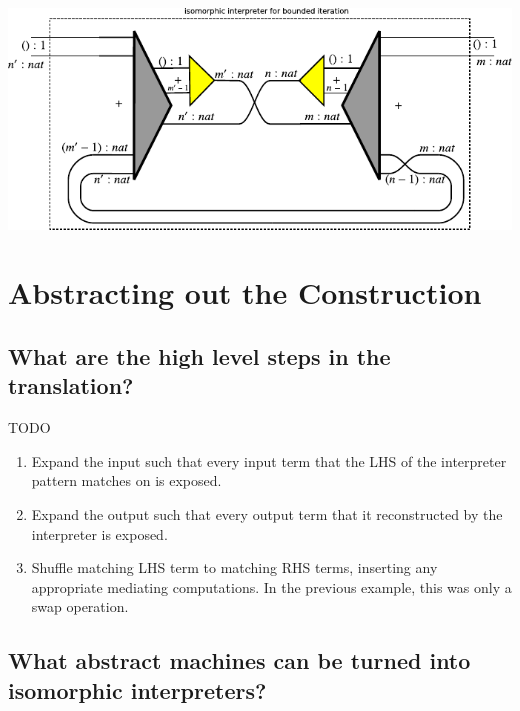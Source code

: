 \documentclass{llncs}
\begin{document}
\begin{enumerate}
\begin{center}
  \includegraphics{diagrams/nat-nat8.pdf}
\end{center}

\end{enumerate}

\section{Abstracting out the Construction}

\subsection{What are the high level steps in the translation?}
\label{sec:steps}

TODO

\begin{enumerate}
\item Expand the input such that every input term that the LHS of the
  interpreter pattern matches on is exposed.

\item Expand the output such that every output term that it
  reconstructed by the interpreter is exposed.

\item Shuffle matching LHS term to matching RHS terms, inserting any
  appropriate mediating computations. In the previous example, this
  was only a swap operation.

\end{enumerate}

\subsection{What abstract machines can be turned into isomorphic interpreters?}
\end{document}
